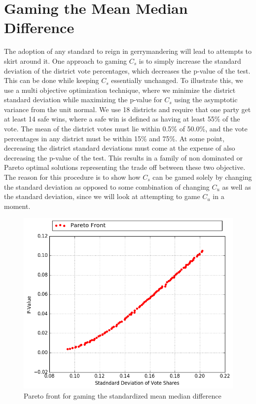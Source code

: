 \documentclass[preprint,12pt]{article}
\begin{document}
\section{Gaming the Mean Median Difference\label{sec:gaming}}
The adoption of any standard to reign in gerrymandering will lead to attempts to skirt around it.
One approach to gaming $C_{s}$ is to simply increase the standard deviation of the district vote percentages, which decreases the p-value of the test.
This can be done while keeping $C_{s}$ essentially unchanged.
To illustrate this, we use a multi objective optimization technique, where we minimize the district standard deviation while maximizing the p-value for $C_{s}$ using the asymptotic variance from the unit normal.
We use 18 districts and require that one party get at least 14 safe wins, where a safe win is defined as having at least 55\% of the vote.
The mean of the district votes must lie within 0.5\% of 50.0\%, and the vote percentages in any district must be within 15\% and 75\%.
At some point, decreasing the district standard deviations must come at the expense of also decreasing the p-value of the test.
This results in a family of non dominated or Pareto optimal solutions representing the trade off between these two objective.
The reason for this procedure is to show how $C_{s}$ can be gamed solely by changing the standard deviation as opposed to some combination of changing $C_{u}$ as well as the standard deviation, since we will look at attempting to game $C_{u}$ in a moment.
\begin{figure}[htb!]
    \begin{center}
        \includegraphics[scale=0.8]{../Figures/SimVsAsymptotic/pareto.png}
        \caption{Pareto front for gaming the standardized mean median difference}\label{fig:pareto}
    \end{center}
\end{figure}
\end{document}
